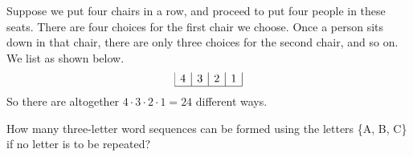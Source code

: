 \begin{solution}
    Suppose we put four chairs in a row, and proceed to put four people in these seats. There are four choices for the first chair we choose. Once a person sits down in that chair, there are only three choices for the second chair, and so on. We list as shown below.
    \[
        \begin{array}{|c|c|c|c|}
            4 & 3 & 2 & 1 \\
            \hline
        \end{array}
    \]
    So there are altogether \( 4 \cdot 3 \cdot 2 \cdot 1 = 24 \) different ways.
\end{solution}

\begin{example}\label{example_tree_of_three_letter_sequences}
    How many three-letter word sequences can be formed using the letters \{A, B, C\} if no letter is to be repeated?
\end{example}

